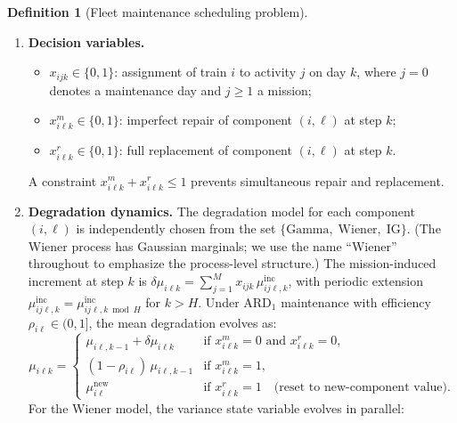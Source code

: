 \documentclass[11pt,a4paper]{article}
\theoremstyle{plain}
\theoremstyle{definition}
\newtheorem{definition}[theorem]{Definition}
\theoremstyle{remark}
\begin{document}
\begin{definition}[Fleet maintenance scheduling problem]
\begin{enumerate}[nosep,leftmargin=2em]
  \item \textbf{Decision variables.}
    \begin{itemize}[nosep]
      \item $x_{ijk} \in \{0,1\}$: assignment of train $i$ to activity $j$ on day $k$,
            where $j = 0$ denotes a maintenance day and $j \ge 1$ a mission;
      \item $x^m_{i\ell k} \in \{0,1\}$: imperfect repair of component $(i,\ell)$ at step $k$;
      \item $x^r_{i\ell k} \in \{0,1\}$: full replacement of component $(i,\ell)$ at step $k$.
    \end{itemize}
    A constraint $x^m_{i\ell k} + x^r_{i\ell k} \le 1$ prevents simultaneous
    repair and replacement.

  \item \textbf{Degradation dynamics.} The degradation model for each component
    $(i,\ell)$ is independently chosen from the set
    $\{\text{Gamma},\; \text{Wiener},\; \text{IG}\}$.
    (The Wiener process has Gaussian marginals; we use the name ``Wiener''
    throughout to emphasize the process-level structure.)
    The mission-induced increment at step $k$ is
    $\delta\mu_{i\ell k} = \sum_{j=1}^{M} x_{ijk}\,\mu^{\mathrm{inc}}_{ij\ell,k}$,
    with periodic extension $\mu^{\mathrm{inc}}_{ij\ell,k} = \mu^{\mathrm{inc}}_{ij\ell,k \bmod H}$
    for $k > H$. Under ARD$_1$ maintenance with efficiency $\rho_{i\ell} \in (0,1]$,
    the mean degradation evolves as:
    \begin{equation}\label{eq:framing:dynamics}
      \mu_{i\ell k} = \begin{cases}
        \mu_{i\ell,k-1} + \delta\mu_{i\ell k}
          & \text{if } x^m_{i\ell k} = 0 \text{ and } x^r_{i\ell k} = 0, \\[3pt]
        (1 - \rho_{i\ell})\,\mu_{i\ell,k-1}
          & \text{if } x^m_{i\ell k} = 1, \\[3pt]
        \mu^{\mathrm{new}}_{i\ell}
          & \text{if } x^r_{i\ell k} = 1
          \quad\text{(reset to new-component value)}.
      \end{cases}
    \end{equation}
    For the Wiener model, the variance state variable evolves in parallel:
    \begin{equation}\label{eq:framing:var_dynamics}

\end{equation}
\end{enumerate}
\end{definition}
\end{document}
